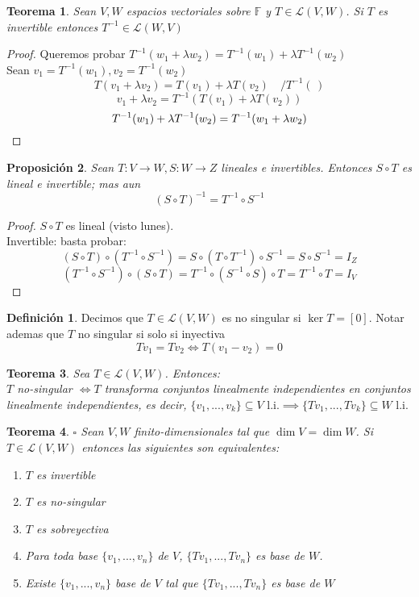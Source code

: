 \documentclass[11pt]{book}
\newtheorem{thm}{Teorema}[section]
\newtheorem{prop}[thm]{Proposición}
\theoremstyle{definition}
\newtheorem{defn}{Definición}[section]
\begin{document}
\begin{thm}
Sean $V,W$ espacios vectoriales sobre $\mathbb{F}$ y $T\in\mathcal{L}(V,W)$. Si $T$ es invertible entonces $T^{-1}\in\mathcal{L}(W,V)$
\end{thm}
\begin{proof}
Queremos probar $T^{-1}(w_1+\lambda w_2)=T^{-1}(w_1)+\lambda T^{-1}(w_2)$\\
Sean $v_1=T^{-1}(w_1),v_2=T^{-1}(w_2)$
\[
T(v_1+\lambda v_2)=T(v_1)+\lambda T(v_2)\quad /T^{-1}(\,)
\]
\[
v_1+\lambda v_2=T^{-1}(T(v_1)+\lambda T(v_2))
\]
\begin{equation}
T^{-1}(w_1)+\lambda T^{-1}(w_2)=T^{-1}(w_1+\lambda w_2)\qedhere
\end{equation}
\end{proof}
\begin{prop}
Sean $T:V\rightarrow W,S:W\rightarrow Z$ lineales e invertibles. Entonces $S\circ T$ es lineal e invertible; mas aun
\begin{equation}
(S\circ T)^{-1}=T^{-1}\circ S^{-1}
\end{equation}
\end{prop}
\begin{proof}
$S\circ T$ es lineal (visto lunes).\\
Invertible: basta probar:
\[
(S\circ T)\circ(T^{-1}\circ S^{-1})=S\circ (T\circ T^{-1})\circ S^{-1}=S\circ S^{-1}=I_Z
\]
\[
(T^{-1}\circ S^{-1})\circ (S\circ T)=T^{-1}\circ (S^{-1}\circ S)\circ T=T^{-1}\circ T=I_V
\]
\end{proof}
\begin{defn}
Decimos que $T\in\mathcal{L}(V,W)$ es no singular si $\ker T=[0]$. Notar ademas que $T$ no singular si solo si inyectiva
\begin{equation}
Tv_1=Tv_2\iff T(v_1-v_2)=0
\end{equation}
\end{defn}
\begin{thm}
Sea $T\in\mathcal{L}(V,W)$. Entonces:\\
$T$ no-singular $\iff T$ transforma conjuntos linealmente independientes en conjuntos linealmente independientes, es decir, $\{v_1,...,v_k\}\subseteq V\textrm{ l.i.}\implies\{Tv_1,...,Tv_k\}\subseteq W\textrm{ l.i.}$
\end{thm}
\begin{thm}{$\square$ }
Sean $V,W$ finito-dimensionales tal que $\dim V=\dim W$. Si $T\in\mathcal{L}(V,W)$ entonces las siguientes son equivalentes:
\begin{enumerate}[label=\roman*)]
	\item $T$ es invertible
	
	\item $T$ es no-singular
	
	\item $T$ es sobreyectiva
	
	\item Para toda base $\{v_1,...,v_n\}$ de $V$, $\{Tv_1,...,Tv_n\}$ es base de $W$.
	
	\item Existe $\{v_1,...,v_n\}$ base de $V$ tal que $\{Tv_1,...,Tv_n\}$ es base de $W$
\end{enumerate}
\end{thm}
\end{document}
